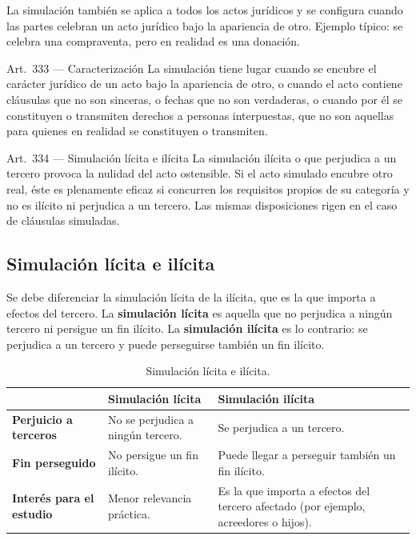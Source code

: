 \documentclass[12pt,oneside]{book}
\begin{document}
La simulaci\'on tambi\'en se aplica a todos los actos jur\'idicos y se configura cuando las partes celebran un acto jur\'idico bajo la apariencia de otro. Ejemplo t\'ipico: se celebra una compraventa, pero en realidad es una donaci\'on.

\begin{norma}{Art.~333 --- Caracterizaci\'on}
La simulaci\'on tiene lugar cuando se encubre el car\'acter jur\'idico de un acto bajo la apariencia de otro, o cuando el acto contiene cl\'ausulas que no son sinceras, o fechas que no son verdaderas, o cuando por \'el se constituyen o transmiten derechos a personas interpuestas, que no son aquellas para quienes en realidad se constituyen o transmiten.
\end{norma}

\begin{norma}{Art.~334 --- Simulaci\'on l\'icita e il\'icita}
La simulaci\'on il\'icita o que perjudica a un tercero provoca la nulidad del acto ostensible. Si el acto simulado encubre otro real, \'este es plenamente eficaz si concurren los requisitos propios de su categor\'ia y no es il\'icito ni perjudica a un tercero. Las mismas disposiciones rigen en el caso de cl\'ausulas simuladas.
\end{norma}

\subsection{Simulaci\'on l\'icita e il\'icita}

Se debe diferenciar la simulaci\'on l\'icita de la il\'icita, que es la que importa a efectos del tercero. La \textbf{simulaci\'on l\'icita} es aquella que no perjudica a ning\'un tercero ni persigue un fin il\'icito. La \textbf{simulaci\'on il\'icita} es lo contrario: se perjudica a un tercero y puede perseguirse tambi\'en un fin il\'icito.

\begin{table}[H]
\centering
\renewcommand{\arraystretch}{1.3}
\begin{tabularx}{\linewidth}{@{}>{\raggedright\arraybackslash}p{3cm}>{\raggedright\arraybackslash}X>{\raggedright\arraybackslash}X@{}}
\toprule
 & \textbf{Simulaci\'on l\'icita} & \textbf{Simulaci\'on il\'icita} \\
\midrule
\textbf{Perjuicio a terceros} & No se perjudica a ning\'un tercero. & Se perjudica a un tercero. \\
\textbf{Fin perseguido} & No persigue un fin il\'icito. & Puede llegar a perseguir tambi\'en un fin il\'icito. \\
\textbf{Inter\'es para el estudio} & Menor relevancia pr\'actica. & Es la que importa a efectos del tercero afectado (por ejemplo, acreedores o hijos). \\
\bottomrule
\end{tabularx}
\caption*{Simulaci\'on l\'icita e il\'icita.}
\end{table}
\end{document}

